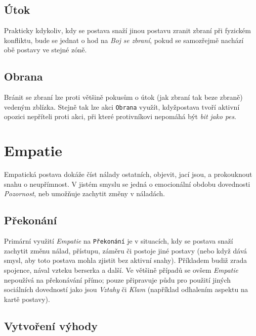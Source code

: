 \documentclass[../main.tex]{subfiles}
\begin{document}
\subsection*{Útok}
\label{subsec:zboj-utok}
\utok

Prakticky kdykoliv, kdy se postava snaží jinou postavu zranit zbraní při fyzickém konfliktu, bude se jednat o hod na \textit{Boj se zbraní}, pokud se samozřejmě nachází obě postavy ve stejné zóně.

\subsection*{Obrana}
\label{subsec:zboj-obrana}
\obrana

Bránit se zbraní lze proti většině pokusům o útok (jak zbraní tak beze zbraně) vedeným zblízka. Stejně tak lze akci \texttt{Obrana} využít, kdyžpostava tvoří aktivní opozici nepříteli proti akci, při které protivníkovi nepomáhá být \textit{bit jako pes}.

\section{Empatie}
\label{sec:empatie}

Empatická postava dokáže číst nálady ostatních, objevit, jací jsou, a prokouknout snahu o neupřímnost. V jistém smyslu se jedná o emocionální obdobu dovednosti \textit{Pozornost}, neb umožňuje zachytit změny v náladách.

\subsection*{Překonání}
\label{subsec:empatie-prekonani}
\prekonani

Primární využití \textit{Empatie} na \texttt{Překonání} je v situacích, kdy se postava snaží zachytit změnu nálad, přístupu, záměru či postoje jiné postavy (nebo když dává smysl, aby toto postava mohla zjistit bez aktivní snahy). Příkladem budiž zrada spojence, nával vzteku berserka a další. Ve většině případů se ovšem \textit{Empatie} nepoužívá na překonávání přímo; pouze připravuje půdu pro použití jiných sociálních dovedností jako jsou \textit{Vztahy} či \textit{Klam} (například odhalením aspektu na kartě postavy).

\subsection*{Vytvoření výhody}
\label{subsec:empatie-vytvoreni}
\vytvoreni
\end{document}
